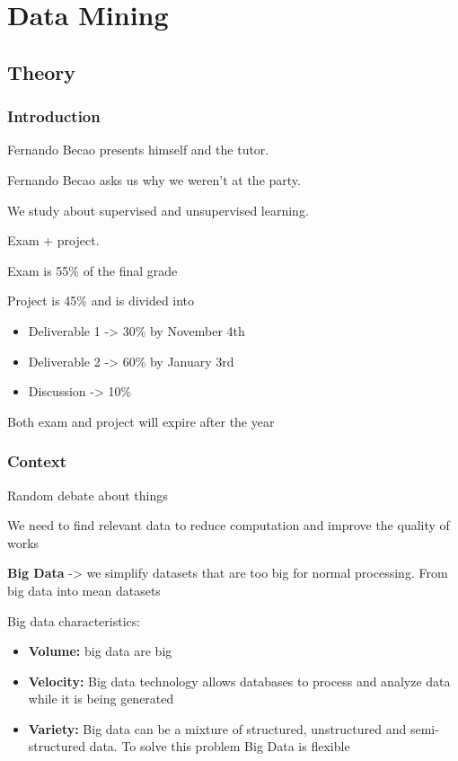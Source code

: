 \section{Data Mining}
\subsection{Theory}

\subsubsection{Introduction}

Fernando Becao presents himself and the tutor.

Fernando Becao asks us why we weren't at the party.

We study about supervised and unsupervised learning.

Exam + project.

Exam is 55\% of the final grade

Project is 45\% and is divided into

\begin{itemize}

\item Deliverable 1 -> 30\% by November 4th
\item Deliverable 2 -> 60\% by January 3rd
\item Discussion -> 10\%
\end{itemize}

Both exam and project will expire after the year


\subsubsection{Context}

Random debate about things

We need to find relevant data to reduce computation and improve the quality of works

\vspace{10pt}

\textbf{Big Data} -> we simplify datasets that are too big for normal processing. From big data into mean datasets

Big data characteristics:
\begin{itemize}
    \item \textbf{Volume:} big data are big
    \item \textbf{Velocity:} Big data technology allows databases to process and analyze data while it is being generated
    \item \textbf{Variety:} Big data can be a mixture of structured, unstructured and semi-structured data. To solve this problem Big Data is flexible
\end{itemize}

